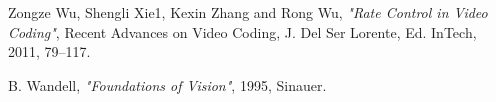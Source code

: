 \documentclass[11pt]{article} %
\begin{document}
\begin{thebibliography}{9}
Zongze Wu, Shengli Xie1, Kexin Zhang and Rong Wu, \textit{"Rate Control in Video Coding"},
Recent Advances on Video Coding, J. Del Ser Lorente, Ed. InTech,
2011, 79–117. %

B. Wandell, \textit{"Foundations of Vision"}, 1995, Sinauer.
\end{thebibliography}
\end{document}
